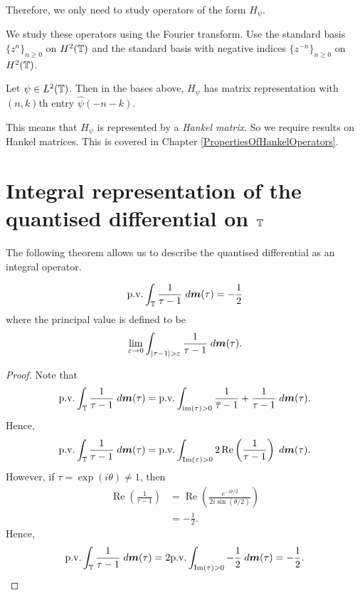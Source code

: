 Therefore, we only need to study operators of the form $H_\psi$.

We study these operators using the Fourier transform. Use the standard basis $\{z^n\}_{n\geq 0}$
on $H^2(\mathbb{T})$ and the standard basis with negative indices $\{z^{-n}\}_{n \geq 0}$ on $H^2(\mathbb{T})$.

Let $\psi \in L^2(\mathbb{T})$. Then in the bases above, $H_\psi$ has matrix representation
with $(n,k)$th entry $\hat{\psi}(-n-k)$. 

This means that $H_\psi$ is represented by a \emph{Hankel matrix}. So we require
results on Hankel matrices. This is covered in Chapter \ref{PropertiesOfHankelOperators}.

\section{Integral representation of the quantised differential on $\mathbb{T}$}
The following theorem allows us to describe the quantised differential as an integral operator.
\begin{lemma}
\label{singularIntegral}
    \begin{equation*}
        \mathrm{p.v.}\int_{\mathbb{T}} \frac{1}{\tau-1}\;d\boldsymbol{m}(\tau) = -\frac{1}{2}
    \end{equation*}
    where the principal value is defined to be
    \begin{equation*}
        \lim_{\varepsilon\rightarrow 0} \int_{|\tau-1|>\varepsilon} \frac{1}{\tau-1}\;d\ha(\tau).
    \end{equation*}
\end{lemma} 
\begin{proof}
    Note that
    \begin{equation*}
        \mathrm{p.v.}\int_{\mathbb{T}} \frac{1}{\tau-1}\;d\boldsymbol{m}(\tau) = \mathrm{p.v.}\int_{\operatorname{im}(\tau) > 0} \frac{1}{\overline{\tau}-1}+\frac{1}{\tau-1}\;d\boldsymbol{m}(\tau).
    \end{equation*}
    Hence,
    \begin{equation*}
        \mathrm{p.v.}\int_{\mathbb{T}} \frac{1}{\tau-1}\;d\boldsymbol{m}(\tau) = \mathrm{p.v.}\int_{\operatorname{Im}(\tau)>0} 2\operatorname{Re}\left(\frac{1}{\tau-1}\right)\;d\boldsymbol{m}(\tau).
    \end{equation*}
    However, if $\tau = \exp(i\theta) \neq 1$, then
    \begin{align*}
        \operatorname{Re}\left(\frac{1}{\tau-1}\right) &= \operatorname{Re}\left(\frac{e^{-i\theta/2}}{2i\sin(\theta/2)}\right)\\
        &= -\frac{1}{2}.
    \end{align*}
    Hence,
    \begin{equation*}
        \mathrm{p.v.}\int_{\mathbb{T}} \frac{1}{\tau-1}\;d\boldsymbol{m}(\tau) = 2\mathrm{p.v.}\int_{\operatorname{Im}(\tau)>0} -\frac{1}{2}\;d\boldsymbol{m}(\tau) = -\frac{1}{2}.
    \end{equation*}
\end{proof}
